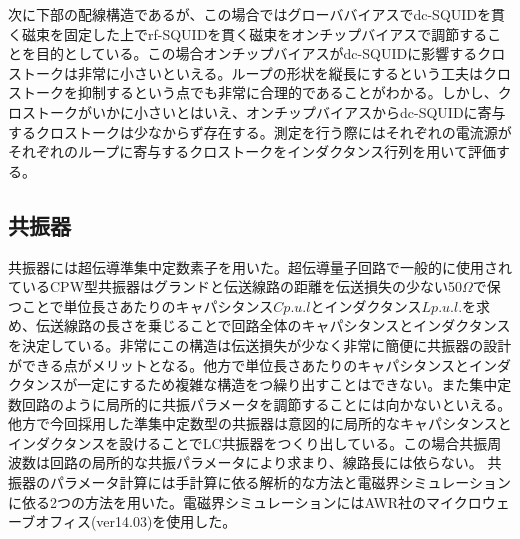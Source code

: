         次に下部の配線構造であるが、この場合ではグローババイアスでdc-SQUIDを貫く磁束を固定した上でrf-SQUIDを貫く磁束をオンチップバイアスで調節することを目的としている。この場合オンチップバイアスがdc-SQUIDに影響するクロストークは非常に小さいといえる。ループの形状を縦長にするという工夫はクロストークを抑制するという点でも非常に合理的であることがわかる。しかし、クロストークがいかに小さいとはいえ、オンチップバイアスからdc-SQUIDに寄与するクロストークは少なからず存在する。測定を行う際にはそれぞれの電流源がそれぞれのループに寄与するクロストークをインダクタンス行列を用いて評価する。

    \subsection{共振器}
        共振器には超伝導準集中定数素子を用いた。超伝導量子回路で一般的に使用されているCPW型共振器はグランドと伝送線路の距離を伝送損失の少ない50$\Omega$で保つことで単位長さあたりのキャパシタンス$Cp.u.l$とインダクタンス$Lp.u.l.$を求め、伝送線路の長さを乗じることで回路全体のキャパシタンスとインダクタンスを決定している。非常にこの構造は伝送損失が少なく非常に簡便に共振器の設計ができる点がメリットとなる。他方で単位長さあたりのキャパシタンスとインダクタンスが一定にするため複雑な構造をつ繰り出すことはできない。また集中定数回路のように局所的に共振パラメータを調節することには向かないといえる。他方で今回採用した準集中定数型の共振器は意図的に局所的なキャパシタンスとインダクタンスを設けることでLC共振器をつくり出している。この場合共振周波数は回路の局所的な共振パラメータにより求まり、線路長には依らない。
        共振器のパラメータ計算には手計算に依る解析的な方法と電磁界シミュレーションに依る2つの方法を用いた。電磁界シミュレーションにはAWR社のマイクロウェーブオフィス(ver14.03)を使用した。
